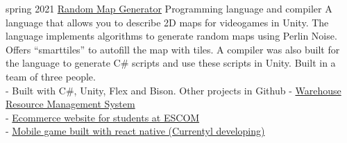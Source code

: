 \documentclass[9pt]{developercv} %
\begin{document}


\begin{entrylist}
	\entry
		{spring 2021}
		{\href{https://github.com/DanielMontesGuerrero/random-map-generator}{Random Map Generator}}
		{Programming language and compiler}
		{A language that allows you to describe 2D maps for videogames in Unity. The language implements algorithms to generate random maps using Perlin Noise. Offers ``smarttiles'' to autofill the map with tiles. A compiler was also built for the language to generate C\# scripts and use these scripts in Unity. Built in a team of three people.\\
		- Built with C\#, Unity, Flex and Bison.}
	\entry
		{}
		{Other projects in Github}
		{}
		{
			- \href{https://github.com/DanielMontesGuerrero/sistema-picking-app}{Warehouse Resource Management System}\\
			- \href{https://github.com/DanielMontesGuerrero/la-tiendita}{Ecommerce website for students at ESCOM}\\
			- \href{https://github.com/CatadoresDeAnime/potential-octo-meme}{Mobile game built with react native (Currentyl developing)}
		}
\end{entrylist}

\end{document}
